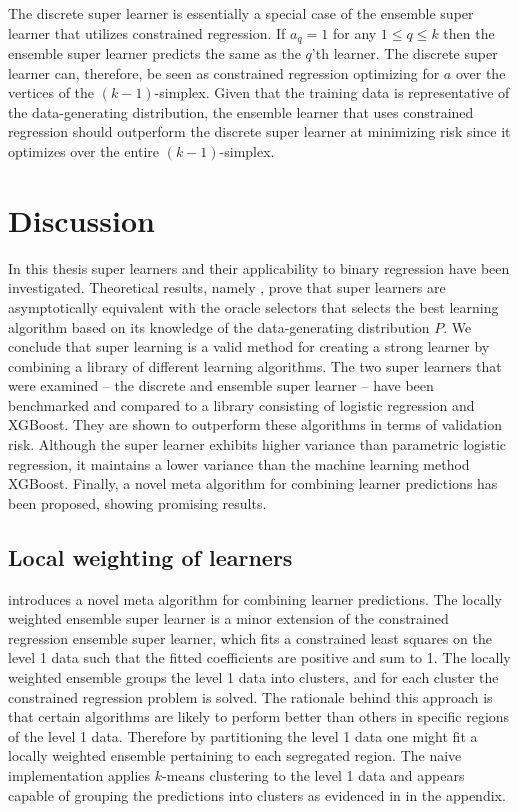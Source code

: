 \documentclass[11pt, a4paper]{article}
\theoremstyle{definition}
\theoremstyle{remark}
\newcommand{\q}{q}
\newcommand{\ml}{k}
\begin{document}
The discrete super learner is essentially a special case of the ensemble super learner that utilizes constrained regression. If $ a_\q = 1 $ for any $ 1 \leq \q \leq k $ then the ensemble super learner predicts the same as the $ \q $'th learner. The discrete super learner can, therefore, be seen as constrained regression optimizing for $ a $ over the vertices of the $ (\ml -1) $-simplex. Given that the training data is representative of the data-generating distribution, the ensemble learner that uses constrained regression should outperform the discrete super learner at minimizing risk since it optimizes over the entire $ (\ml -1) $-simplex.  


\section{Discussion}
In this thesis super learners and their applicability to binary regression have been investigated. Theoretical results, namely , prove that super learners are asymptotically equivalent with the oracle selectors that selects the best learning algorithm based on its knowledge of the data-generating distribution $ P $. We conclude that super learning is a valid method for creating a strong learner by combining a library of different learning algorithms. The two super learners that were examined -- the discrete and ensemble super learner -- have been benchmarked and compared to a library consisting of logistic regression and XGBoost. They are shown to outperform these algorithms in terms of validation risk. Although the super learner exhibits higher variance than parametric logistic regression, it maintains a lower variance than the machine learning method XGBoost. Finally, a novel meta algorithm for combining learner predictions has been proposed, showing promising results.  

\subsection{Local weighting of learners}
 introduces a novel meta algorithm for combining learner predictions. The locally weighted ensemble super learner is a minor extension of the constrained regression ensemble super learner, which fits a constrained least squares on the level 1 data such that the fitted coefficients are positive and sum to 1. The locally weighted ensemble groups the level 1 data into clusters, and for each cluster the constrained regression problem is solved. The rationale behind this approach is that certain algorithms are likely to perform better than others in specific regions of the level 1 data. Therefore by partitioning the level 1 data one might fit a locally weighted ensemble pertaining to each segregated region. The naive implementation applies $ k $-means clustering to the level 1 data and appears capable of grouping the predictions into clusters as evidenced in  in the appendix. 
\end{document}
